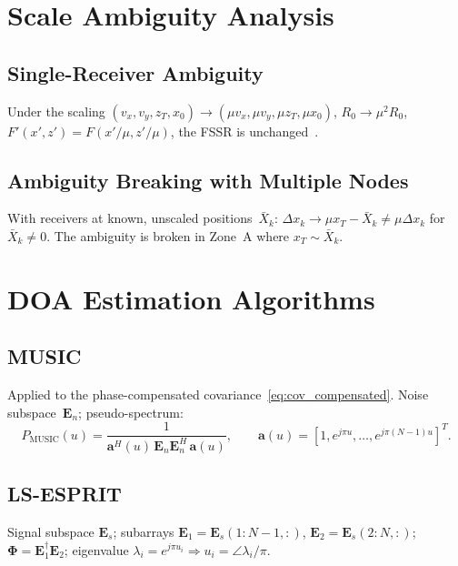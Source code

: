 \documentclass[11pt,a4paper]{article}
\begin{document}
\section{Scale Ambiguity Analysis}
\label{sec:ambiguity}

\subsection{Single-Receiver Ambiguity}
Under the scaling
$(v_x,v_y,z_T,x_0)\to(\mu v_x,\mu v_y,\mu z_T,\mu x_0)$,
$R_0\to\mu^2 R_0$,
$F'(x',z')=F(x'/\mu,z'/\mu)$,
the FSSR is unchanged~\cite{IETDraft4}.

\subsection{Ambiguity Breaking with Multiple Nodes}
With receivers at known, unscaled positions~$\bar{X}_k$:
$\Delta x_k\to\mu x_T-\bar{X}_k\ne\mu\Delta x_k$ for
$\bar{X}_k\ne 0$.  The ambiguity is broken in Zone~A where
$x_T\sim\bar{X}_k$.

\section{DOA Estimation Algorithms}
\label{sec:doa_algs}

\subsection{MUSIC}
Applied to the phase-compensated covariance~\eqref{eq:cov_compensated}.
Noise subspace~$\mathbf{E}_n$; pseudo-spectrum:
\begin{equation}
  P_{\mathrm{MUSIC}}(u)
  = \frac{1}{\mathbf{a}^H(u)\,\mathbf{E}_n\mathbf{E}_n^H\,
  \mathbf{a}(u)},\qquad
  \mathbf{a}(u)=[1,e^{j\pi u},\ldots,e^{j\pi(N-1)u}]^T.
  \label{eq:music}
\end{equation}

\subsection{LS-ESPRIT}
Signal subspace $\mathbf{E}_s$; subarrays
$\mathbf{E}_1=\mathbf{E}_s(1{:}N{-}1,:)$,
$\mathbf{E}_2=\mathbf{E}_s(2{:}N,:)$;
$\bm{\Phi}=\mathbf{E}_1^\dagger\mathbf{E}_2$;
eigenvalue $\lambda_i=e^{j\pi u_i}\Rightarrow u_i=\angle\lambda_i/\pi$.
\end{document}
